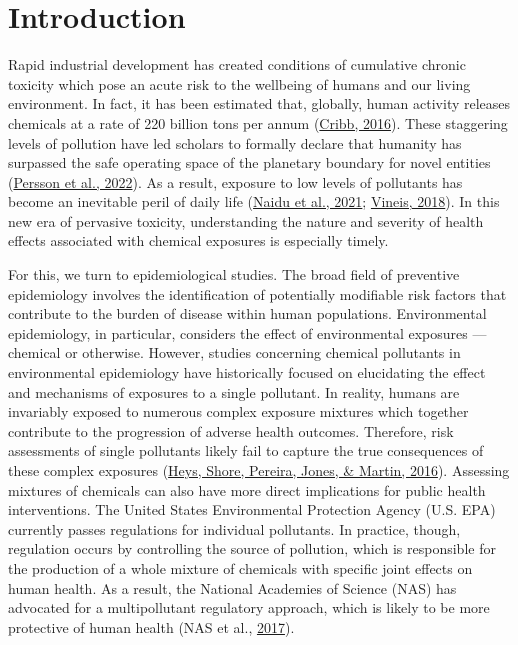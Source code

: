\documentclass[12pt, twoside]{amherstthesis}
\begin{document}
\hypertarget{intro}{%
\chapter{Introduction}\label{intro}}

Rapid industrial development has created conditions of cumulative chronic toxicity which pose an acute risk to the wellbeing of humans and our living environment. In fact, it has been estimated that, globally, human activity releases chemicals at a rate of 220 billion tons per annum (\protect\hyperlink{ref-cribb_surviving_2016}{Cribb, 2016}). These staggering levels of pollution have led scholars to formally declare that humanity has surpassed the safe operating space of the planetary boundary for novel entities (\protect\hyperlink{ref-persson_outside_2022}{Persson et al., 2022}). As a result, exposure to low levels of pollutants has become an inevitable peril of daily life (\protect\hyperlink{ref-naidu_chemical_2021}{Naidu et al., 2021}; \protect\hyperlink{ref-vineis_john_2018}{Vineis, 2018}). In this new era of pervasive toxicity, understanding the nature and severity of health effects associated with chemical exposures is especially timely.

For this, we turn to epidemiological studies. The broad field of preventive epidemiology involves the identification of potentially modifiable risk factors that contribute to the burden of disease within human populations. Environmental epidemiology, in particular, considers the effect of environmental exposures --- chemical or otherwise. However, studies concerning chemical pollutants in environmental epidemiology have historically focused on elucidating the effect and mechanisms of exposures to a single pollutant. In reality, humans are invariably exposed to numerous complex exposure mixtures which together contribute to the progression of adverse health outcomes. Therefore, risk assessments of single pollutants likely fail to capture the true consequences of these complex exposures (\protect\hyperlink{ref-heys_risk_2016}{Heys, Shore, Pereira, Jones, \& Martin, 2016}). Assessing mixtures of chemicals can also have more direct implications for public health interventions. The United States Environmental Protection Agency (U.S. EPA) currently passes regulations for individual pollutants. In practice, though, regulation occurs by controlling the source of pollution, which is responsible for the production of a whole mixture of chemicals with specific joint effects on human health. As a result, the National Academies of Science (NAS) has advocated for a multipollutant regulatory approach, which is likely to be more protective of human health (NAS et al., \protect\hyperlink{ref-national_academies_of_sciences_engineering_and_medicine_using_2017}{2017}).
\end{document}

